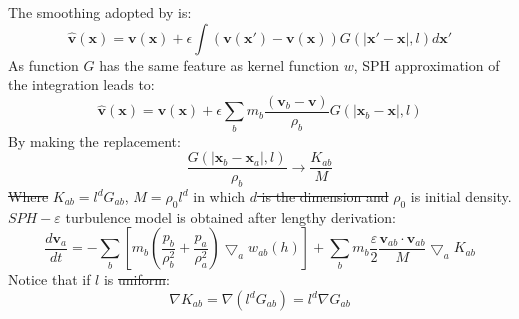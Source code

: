 \documentclass[gmd, manuscript]{copernicus} %
\providecommand{\DIFadd}[1]{{\protect\color{blue}\uwave{#1}}} %
\providecommand{\DIFdel}[1]{{\protect\color{red}\sout{#1}}}                      %
\providecommand{\DIFaddbegin}{} %
\providecommand{\DIFaddend}{} %
\providecommand{\DIFdelbegin}{} %
\providecommand{\DIFdelend}{} %
\begin{document}
The smoothing adopted by \citet{monaghan2011turbulence}  is:
\begin{equation}
\widehat{\textbf{v}}\left(\textbf{x}\right)=\textbf{v}\left(\textbf{x}\right)+ \epsilon \int \left(\textbf{v}\left(\textbf{x} \prime\right)-\textbf{v}\left(\textbf{x}\right)\right)G\left(\vert \textbf{x} \prime - \textbf{x} \vert, l\right) d\textbf{x} \prime
\end{equation}
As function $G$ has the same feature as kernel function $w$, SPH approximation of the integration leads to:
\begin{equation} \label{eq:SPH-epsilon-filtering}
\widehat{\textbf{v}}\left(\textbf{x}\right)=\textbf{v}\left(\textbf{x}\right)+\epsilon \sum_b m_b \dfrac{\left(\textbf{v}_b -\textbf{v}\right)}{\rho _b} G\left(\vert \textbf{x} _b - \textbf{x} \vert, l\right)
\end{equation}
By making the replacement:
\begin{equation}
\label{eq:replacement-in-turb-derive}
\dfrac{G\left(\vert \textbf{x} _b - \textbf{x} _a \vert, l\right)}{\rho _b} \rightarrow \dfrac{K_{ab}}{M}
\end{equation}
\DIFdelbegin \DIFdel{Where }\DIFdelend \DIFaddbegin \DIFadd{where }\DIFaddend $K_{ab} = l^d G_{ab}$, $M = \rho_0 l^d$ in which \DIFdelbegin \DIFdel{$d$ is the dimension and }\DIFdelend $\rho_0$ is initial density. $SPH-\varepsilon$ turbulence model is obtained after lengthy derivation:
\begin{equation}
\label{eq:monaghan-mom-turb}
\dfrac{d \textbf{v}_a}{dt} = -\sum_b \left[ m_b \left(\dfrac{p_b}{\rho_b^2} + \dfrac{p_a}{\rho_a^2}\right) \bigtriangledown_aw_{a b}\left(h\right)\right] + \sum_b m_b \dfrac{\varepsilon}{2} \dfrac{\textbf{v}_{ab} \cdot \textbf{v}_{ab}}{M} \bigtriangledown_a K_{ab}
\end{equation}
Notice that if $l$ is \DIFdelbegin \DIFdel{uniform}\DIFdelend \DIFaddbegin \DIFadd{constant}\DIFaddend : 
%
%
\begin{equation}
\nabla K_{ab} = \nabla \left(l^d G_{ab}\right) = l^d \nabla G_{ab}
\end{equation}
\end{document}
